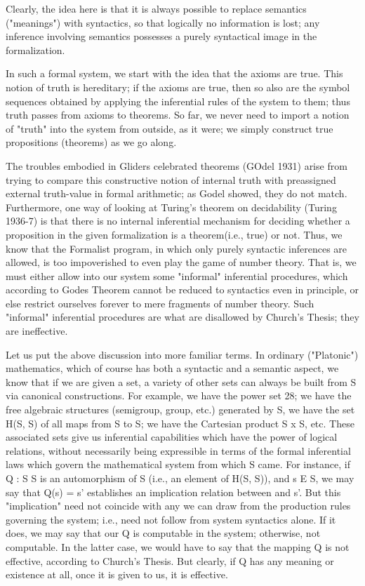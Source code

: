 \documentclass[a4paper,12pt]{article}
\begin{document}
Clearly, the idea here is that it is always possible to replace semantics ("meanings")
with syntactics, so that logically no information is lost; any inference involving semantics
possesses a purely syntactical image in the formalization.

In such a formal system, we start with the idea that the axioms are true.
This notion of truth is hereditary; if the axioms are true, then so also are the
symbol sequences obtained by applying the inferential rules of the system to them;
thus truth passes from axioms to theorems. So far, we never need to import a notion of "truth"
into the system from outside, as it were; we simply construct true propositions (theorems)
as we go along.

The troubles embodied in Gliders celebrated theorems (GOdel 1931)
arise from trying to compare this constructive notion of internal truth with
preassigned external truth-value in formal arithmetic; as Godel showed, they
do not match. Furthermore, one way of looking at Turing's theorem on decidability (Turing 1936-7)
is that there is no internal inferential mechanism for deciding whether a proposition
in the given formalization is a theorem(i.e., true) or not. Thus, we know that the Formalist program,
in which only purely syntactic inferences are allowed, is too impoverished to even play the game of number theory.
That is, we must either allow into our system some "informal" inferential procedures, which according to Godes Theorem
cannot be reduced to syntactics even in principle, or else restrict ourselves forever to mere fragments of number theory.
Such "informal" inferential procedures are what are disallowed by Church's Thesis; they are ineffective.

Let us put the above discussion into more familiar terms. In ordinary
("Platonic") mathematics, which of course has both a syntactic and a semantic aspect,
we know that if we are given a set, a variety of other sets
can always be built from S via canonical constructions. For example, we
have the power set 28; we have the free algebraic structures (semigroup,
group, etc.)  generated by S, we have the set H(S, S) of all maps from
S to S; we have the Cartesian product S x S, etc. These associated sets
give us inferential capabilities which have the power of logical relations,
without necessarily being expressible in terms of the formal inferential laws
which govern the mathematical system from which S came. For instance,
if Q : S 	S is an automorphism of S (i.e., an element of H(S, S)), and
s E S, we may say that Q(s) = s' establishes an implication relation between and s'.
But this "implication" need not coincide with any we can draw
from the production rules governing the system; i.e., need not follow from
system syntactics alone. If it does, we may say that our Q is computable in
the system; otherwise, not computable. In the latter case, we would have to
say that the mapping Q is not effective, according to Church's Thesis. But
clearly, if Q has any meaning or existence at all, once it is given to us, it is
effective.
\end{document}
